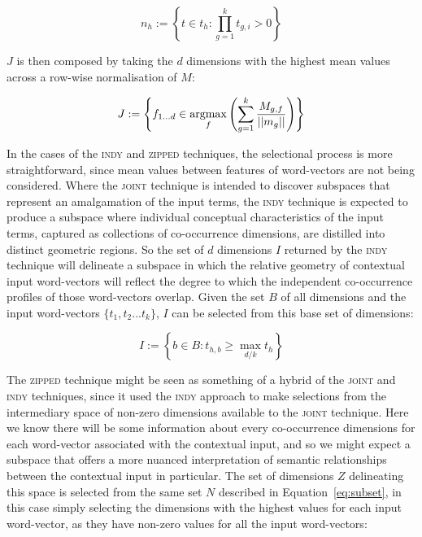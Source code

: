 \begin{equation} \label{eq:subset}
n_h := \left \{t \in t_h: \prod_{g=1}^{k} t_{g,i} > 0\right \}
\end{equation}

\noindent $J$ is then composed by taking the $d$ dimensions with the highest mean values across a row-wise normalisation of $M$:

\begin{equation}
J := \left \{ f_{1...d} \in \operatorname*{argmax}_{f}\left(\sum_{g=1}^{k} \frac{M_{g,f}}{||m_g||}\right)\right \}
\end{equation}

\noindent In the cases of the \textsc{indy} and \textsc{zipped} techniques, the selectional process is more straightforward, since mean values between features of word-vectors are not being considered.  Where the \textsc{joint} technique is intended to discover subspaces that represent an amalgamation of the input terms, the \textsc{indy} technique is expected to produce a subspace where individual conceptual characteristics of the input terms, captured as collections of co-occurrence dimensions, are distilled into distinct geometric regions.  So the set of $d$ dimensions $I$ returned by the \textsc{indy} technique will delineate a subspace in which the relative geometry of contextual input word-vectors will reflect the degree to which the independent co-occurrence profiles of those word-vectors overlap.  Given the set $B$ of all dimensions and the input word-vectors $\{t_1, t_2... t_k\}$, $I$ can be selected from this base set of dimensions:

\begin{equation}
I := \left \{b \in B: t_{h,b} \geq \max_{d/k} t_h \right \}
\end{equation}

\noindent The \textsc{zipped} technique might be seen as something of a hybrid of the \textsc{joint} and \textsc{indy} techniques, since it used the \textsc{indy} approach to make selections from the intermediary space of non-zero dimensions available to the \textsc{joint} technique.  Here we know there will be some information about every co-occurrence dimensions for each word-vector associated with the contextual input, and so we might expect a subspace that offers a more nuanced interpretation of semantic relationships between the contextual input in particular.  The set of dimensions $Z$ delineating this space is selected from the same set $N$ described in Equation~\ref{eq:subset}, in this case simply selecting the dimensions with the highest values for each input word-vector, as they have non-zero values for all the input word-vectors:


